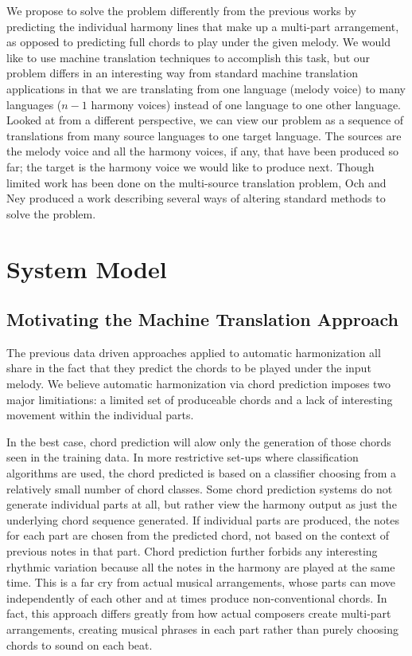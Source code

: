 \documentclass{sig-alternate}
\begin{document}
We propose to solve the problem differently from the previous works by predicting the individual harmony lines that make up
a multi-part arrangement, as opposed to predicting full chords to play under the given melody. We would like to use machine
translation techniques to accomplish this task, but our problem differs in an interesting way from standard machine translation
applications in that we are translating from one language (melody voice) to many languages ($n - 1$ harmony voices) instead of one language to one other language. Looked at from a different perspective, we can view our problem as a sequence of translations from many source languages to one target language. The sources are the melody voice and all the harmony voices, if any, that have been produced so far; the target is the harmony voice we would like to produce next. Though limited work has been done on the multi-source translation problem, Och and Ney \cite{franzjosefochhermannney2001} produced a work describing several ways of altering standard methods to solve the problem.

\section{System Model}
\label{sec:sys_model}
\subsection{Motivating the Machine Translation Approach}

The previous data driven approaches applied to automatic harmonization all share in the fact that they predict the chords to be played under the input melody. We believe automatic harmonization via chord prediction imposes two major limitiations: a limited set of produceable chords and a lack of interesting movement within the individual parts. 

In the best case, chord prediction will alow only the generation of those chords seen in the training data. In more restrictive set-ups where classification algorithms are used, the chord predicted is based on a classifier choosing from a relatively small number of chord classes. Some chord prediction systems do not generate individual parts at all, but rather view the harmony output as just the underlying chord sequence generated. If individual parts are produced, the notes for each part are chosen from the predicted chord, not based on the context of previous notes in that part. Chord prediction further forbids any interesting rhythmic variation because all the notes in the harmony are played at the same time. This is a far cry from actual musical arrangements, whose parts can move independently of each other and at times produce non-conventional chords. In fact, this approach differs greatly from how actual composers create multi-part arrangements, creating musical phrases in each part rather than purely choosing chords to sound on each beat.
\end{document}
